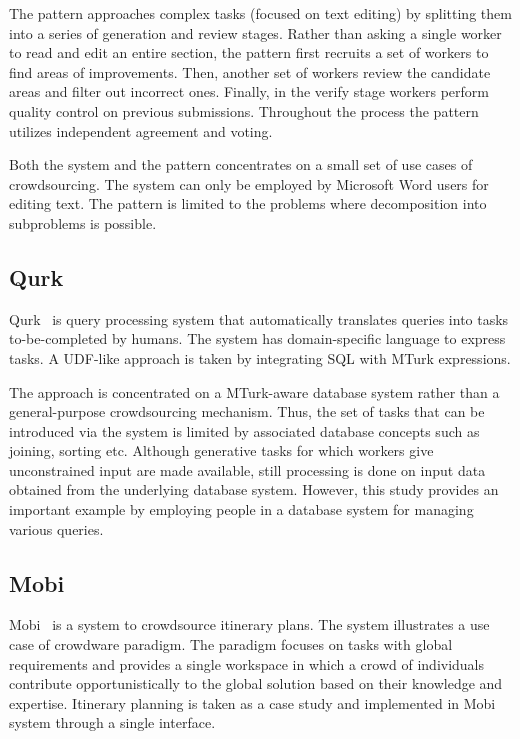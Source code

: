 The pattern approaches complex tasks (focused on text editing) by splitting them 
into a series of generation and review stages. Rather than asking a single worker 
to read and edit an entire section, the pattern first recruits a set of workers to 
find areas of improvements. Then, another set of workers review the candidate 
areas and filter out incorrect ones. Finally, in the verify stage workers perform 
quality control on previous submissions. Throughout the process the pattern 
utilizes independent agreement and voting.

Both the system and the pattern concentrates on a small set of use cases of 
crowdsourcing. The system can only be employed by Microsoft Word users 
for editing text. The pattern is limited to the problems where decomposition 
into subproblems is possible.

\subsection{Qurk}
Qurk~\cite{Marcus2011, Marcus2011b} is query processing system that 
automatically translates queries into tasks to-be-completed by humans. The system 
has domain-specific language to express tasks. A UDF-like approach is taken 
by integrating SQL with MTurk expressions.

The approach is concentrated on a MTurk-aware database system rather than 
a general-purpose crowdsourcing mechanism. Thus, the set of tasks that can be 
introduced via the system is limited by associated database concepts such as 
joining, sorting etc. Although generative tasks for which workers give unconstrained 
input are made available, still processing is done on input data obtained from the 
underlying database system. However, this study provides an important example 
by employing people in a database system for managing various queries.

\subsection{Mobi}
Mobi~\cite{Zhang2012} is a system to crowdsource itinerary plans. The system 
illustrates a use case of crowdware paradigm. The paradigm focuses on tasks 
with global requirements and provides a single workspace in which a crowd of 
individuals contribute opportunistically to the global solution based on their knowledge 
and expertise. Itinerary planning is taken as a case study and implemented 
in Mobi system through a single interface.

